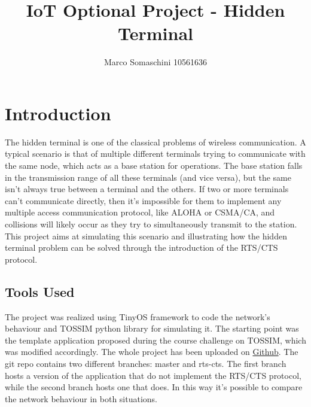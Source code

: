 \documentclass{article}
\title{IoT Optional Project - Hidden Terminal}
\author{\Large Marco Somaschini 10561636}
\date{
	\small
	\parbox{\linewidth}{
	\centering
  		Prof. Matteo Cesana
	\endgraf\smallskip
 		 Academic Year 2021/2022
}}
\begin{document}
\maketitle
\newpage

\tableofcontents
\newpage

\section{Introduction}
The hidden terminal is one of the classical problems of wireless communication. A typical scenario is that of multiple different terminals trying to communicate with the same node, which acts as a base station for operations. The base station falls in the transmission range of all these terminals (and vice versa), but the same isn’t always true between a terminal and the others. If two or more terminals can’t communicate directly, then it’s impossible for them to implement any multiple access communication protocol, like ALOHA or CSMA/CA, and collisions will likely occur as they try to simultaneously transmit to the station. This project aims at simulating this scenario and illustrating how the hidden terminal problem can be solved through the introduction of the RTS/CTS protocol.

\subsection{Tools Used}
The project was realized using TinyOS framework to code the network’s behaviour and TOSSIM python library for simulating it. The starting point was the template application proposed during the course challenge on TOSSIM, which was modified accordingly. The whole project has been uploaded on \href{https://github.com/MarcoSomaschini/iot-hidden-terminal-TOSSIM/tree/rts-cts}{Github}. The git repo contains two different branches: master and rts-cts. The first branch hosts a version of the application that do not implement the RTS/CTS protocol, while the second branch hosts one that does. In this way it’s possible to compare the network behaviour in both situations.
\end{document}

